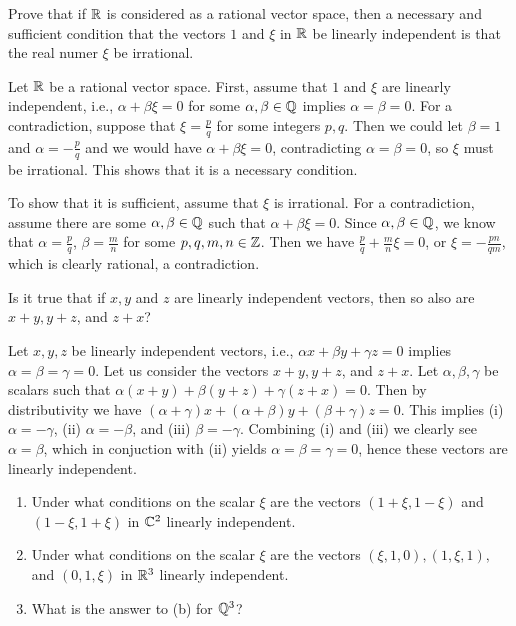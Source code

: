 \begin{problem}
  Prove that if $\mathbb{R}$ is considered as a rational vector space, then a necessary and sufficient condition that the vectors $1$ and $\xi$ in $\mathbb{R}$ be linearly independent is that the real numer $\xi$ be irrational.
\end{problem}

\begin{solution}
  Let $\mathbb{R}$ be a rational vector space.
  First, assume that $1$ and $\xi$ are linearly independent, i.e., $\alpha + \beta \xi = 0$ for some $\alpha, \beta \in \mathbb{Q}$ implies $\alpha = \beta = 0$.
  For a contradiction, suppose that $\xi = \frac{p}{q}$ for some integers $p, q$.
  Then we could let $\beta = 1$ and $\alpha = -\frac{p}{q}$ and we would have $\alpha + \beta \xi = 0$, contradicting $\alpha = \beta = 0$, so $\xi$ must be irrational.
  This shows that it is a necessary condition.

  To show that it is sufficient, assume that $\xi$ is irrational.
  For a contradiction, assume there are some $\alpha, \beta \in \mathbb{Q}$ such that $\alpha + \beta \xi = 0$.
  Since $\alpha, \beta \in \mathbb{Q}$, we know that $\alpha = \frac{p}{q}$, $\beta = \frac{m}{n}$ for some $p, q, m, n \in \mathbb{Z}$.
  Then we have $\frac{p}{q} + \frac{m}{n} \xi = 0$, or $\xi = -\frac{pn}{qm}$, which is clearly rational, a contradiction.
\end{solution}

\begin{problem}
  Is it true that if $x, y$ and $z$ are linearly independent vectors, then so also are $x + y, y + z$, and $z + x$?
\end{problem}

\begin{solution}
  Let $x, y, z$ be linearly independent vectors, i.e., $\alpha x + \beta y + \gamma z = 0$ implies $\alpha = \beta = \gamma = 0$.
  Let us consider the vectors $x + y, y + z$, and $z + x$.
  Let $\alpha, \beta, \gamma$ be scalars such that $\alpha(x + y) + \beta(y + z) + \gamma(z + x) = 0$.
  Then by distributivity we have $(\alpha + \gamma)x + (\alpha + \beta)y + (\beta + \gamma)z = 0$.
  This implies (i) $\alpha = -\gamma$, (ii) $\alpha = -\beta$, and (iii) $\beta = -\gamma$.
  Combining (i) and (iii) we clearly see $\alpha = \beta$, which in conjuction with (ii) yields $\alpha = \beta = \gamma = 0$, hence these vectors are linearly independent.
\end{solution}

\begin{problem}
  \begin{enumerate}[label=(\alph*)]
    \item Under what conditions on the scalar $\xi$ are the vectors $(1 + \xi, 1 - \xi)$ and $(1 - \xi, 1 + \xi)$ in $\mathbb{C}^2$ linearly independent.
    \item Under what conditions on the scalar $\xi$ are the vectors $(\xi, 1, 0), (1, \xi, 1),$ and $(0, 1, \xi)$ in $\mathbb{R}^3$ linearly independent.
    \item What is the answer to (b) for $\mathbb{Q}^3$?
  \end{enumerate}
\end{problem}

